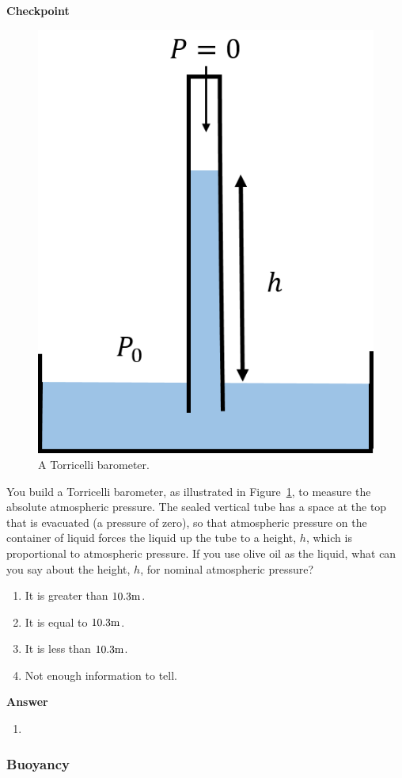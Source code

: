 \begin{framed}
\textbf{Checkpoint}\\
\begin{figure}[!htbp]
\centering
\includegraphics[width=0.3\linewidth]{files/barometer2-ce29b35f970087027dde88afe61f9b72.png}
\caption[]{A Torricelli barometer.}
\label{fig:fluidmechanics:barometer2}
\end{figure}

You build a Torricelli barometer, as illustrated in Figure~\ref{fig:fluidmechanics:barometer2}, to measure the absolute atmospheric pressure. The sealed vertical tube has a space at the top that is evacuated (a pressure of zero), so that atmospheric pressure on the container of liquid forces the liquid up the tube to a height, $h$, which is proportional to atmospheric pressure. If you use olive oil as the liquid, what can you say about the height, $h$, for nominal atmospheric pressure?

\begin{enumerate}
\item It is greater than $10.3 {\rm m}$.
\item It is equal to $10.3 {\rm m}$.
\item It is less than $10.3 {\rm m}$.
\item Not enough information to tell.
\end{enumerate}

\begin{framed}
\textbf{Answer}\\
\begin{enumerate}
\item
\end{enumerate}
\end{framed}
\end{framed}

\subsubsection{Buoyancy}


